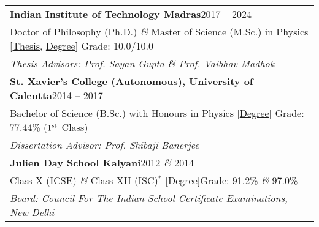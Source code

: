 
\noindent
\begin{tabular}{@{} m{18.5cm}}
\textbf{Indian Institute of Technology Madras}\hfill 2017 -- 2024\\
Doctor of Philosophy (Ph.D.) \textit{\&} Master of Science (M.Sc.) in Physics [\href{https://shodhganga.inflibnet.ac.in/handle/10603/609844}{Thesis}, \href{https://drive.google.com/file/d/1e_EdV3adnDxSkRCMAQGF4_j8DAEQHmok/view?usp=sharing}{Degree}] \hfill Grade: 10.0/10.0\\
\textit{Thesis Advisors: Prof. Sayan Gupta \& Prof. Vaibhav Madhok}\\[0.3cm]

\textbf{St. Xavier's College (Autonomous), University of Calcutta}\hfill 2014 -- 2017\\
Bachelor of Science (B.Sc.) with Honours in Physics [\href{https://drive.google.com/file/d/1kzH1EiCFbbcnvpbOTWJMMhiCC53tkvDD/view?usp=sharing}{Degree}] \hfill Grade: 77.44\% ($1^{\rm st}$ Class)\\
\textit{Dissertation Advisor: Prof. Shibaji Banerjee}\\[0.3cm]

\textbf{Julien Day School Kalyani}\hfill 2012 \textit{\&} 2014\\
Class X (ICSE) \textit{\&} Class XII (ISC)$^{*}$ [\href{https://drive.google.com/file/d/1rBzB5cY0d9NKxEajnIj6dx8uzIBc41sh/view?usp=sharing}{Degree}]\hfill Grade: 91.2\% \textit{\&} 97.0\%\\
\textit{Board: Council For The Indian School Certificate Examinations, New Delhi}
\end{tabular}